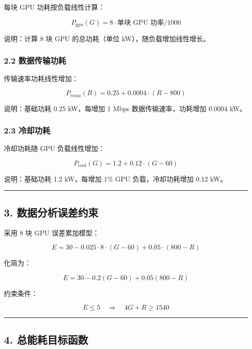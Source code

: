 \documentclass[
]{article}
\begin{document}
每块 GPU 功耗按负载线性计算：

\[P_\text{gpu}(G) = 8 \cdot \text{单块 GPU 功率} / 1000\]

说明：计算 8 块 GPU 的总功耗（单位 kW），随负载增加线性增长。

\subsubsection{2.2
数据传输功耗}\label{22-ux6570ux636eux4f20ux8f93ux529fux8017}

传输速率功耗线性增加：

\[P_\text{trans}(R) = 0.25 + 0.0004 \cdot (R - 800)\]

说明：基础功耗 0.25 kW，每增加 1 Mbps 数据传输速率，功耗增加 0.0004 kW。

\subsubsection{2.3 冷却功耗}\label{23-ux51b7ux5374ux529fux8017}

冷却功耗随 GPU 负载线性增加：

\[P_\text{cool}(G) = 1.2 + 0.12 \cdot (G - 60)\]

说明：基础功耗 1.2 kW，每增加 1\% GPU 负载，冷却功耗增加 0.12 kW。

\begin{center}\rule{0.5\linewidth}{0.5pt}\end{center}

\subsection{3.
数据分析误差约束}\label{3-ux6570ux636eux5206ux6790ux8befux5deeux7ea6ux675f}

采用 8 块 GPU 误差累加模型：

\[E = 30 - 0.025 \cdot 8 \cdot (G - 60) + 0.05 \cdot (800 - R)\]

化简为：

\[E = 30 - 0.2 (G - 60) + 0.05 (800 - R)\]

约束条件：

\[E \le 5 \quad \Rightarrow \quad 4G + R \ge 1540\]

\begin{center}\rule{0.5\linewidth}{0.5pt}\end{center}

\subsection{4.
总能耗目标函数}\label{4-ux603bux80fdux8017ux76eeux6807ux51fdux6570}
\end{document}
